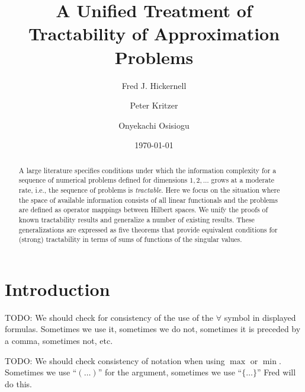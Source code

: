 \documentclass[sort&compress]{elsarticle}
\newcommand{\fred}[1]{\begingroup\color{blue}#1\endgroup}
\begin{document}
\title{\fred{A Unified Treatment of Tractability of Approximation Problems}}

\author[1]{Fred J. Hickernell}
\author[2]{Peter Kritzer}
\author[1]{Onyekachi Osisiogu}
\date{\today}


\begin{abstract}
    A large literature specifies conditions under which the information complexity for a sequence of numerical problems defined for dimensions $1, 2, \ldots$ grows at a moderate rate, i.e., the sequence of problems is \emph{tractable}.  Here we focus on the situation where the space of available information consists of all linear functionals and the problems are defined as operator mappings between Hilbert spaces.  We unify the proofs of known tractability results and generalize a number of existing results.  These generalizations are expressed as five theorems that provide equivalent conditions for (strong) tractability in terms of sums of functions of the singular values.  
\end{abstract}

\maketitle




\section{Introduction}



\medskip


TODO: We should check for consistency of the use of the $\forall$ symbol in displayed formulas. Sometimes we use it, sometimes we do not, sometimes it is preceded by a comma, sometimes not, etc. 

TODO: We should check consistency of notation when using $\max$ or $\min$. Sometimes we use ``$(\ldots)$'' for the argument, sometimes we use ``$\{\ldots\}$''  \fred{Fred will do this.}
\end{document}
